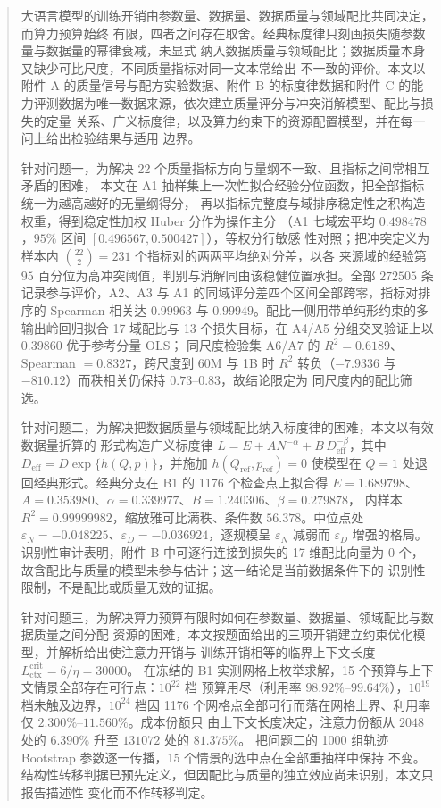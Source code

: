 \documentclass[bwprint]{gmcmthesis}
\numberwithin{equation}{section}
\numberwithin{figure}{section}
\numberwithin{table}{section}
\begin{document}
\begin{abstract}

大语言模型的训练开销由参数量、数据量、数据质量与领域配比共同决定，而算力预算始终
有限，四者之间存在取舍。经典标度律只刻画损失随参数量与数据量的幂律衰减，未显式
纳入数据质量与领域配比；数据质量本身又缺少可比尺度，不同质量指标对同一文本常给出
不一致的评价。本文以附件 A 的质量信号与配方实验数据、附件 B 的标度律数据和附件 C
的能力评测数据为唯一数据来源，依次建立质量评分与冲突消解模型、配比与损失的定量
关系、广义标度律，以及算力约束下的资源配置模型，并在每一问上给出检验结果与适用
边界。

针对问题一，为解决 22 个质量指标方向与量纲不一致、且指标之间常相互矛盾的困难，
本文在 A1 抽样集上一次性拟合经验分位函数，把全部指标统一为越高越好的无量纲得分，
再以指标完整度与域排序稳定性之积构造权重，得到稳定性加权 Huber 分作为操作主分
（A1 七域宏平均 $0.498478$，$95\%$ 区间 $[0.496567,0.500427]$），等权分行敏感
性对照；把冲突定义为样本内 $\binom{22}{2}=231$ 个指标对的两两平均绝对分差，以各
来源域的经验第 $95$ 百分位为高冲突阈值，判别与消解同由该稳健位置承担。全部
$272505$ 条记录参与评价，A2、A3 与 A1 的同域评分差四个区间全部跨零，指标对排序的
Spearman 相关达 $0.99963$ 与 $0.99949$。配比一侧用带单纯形约束的多输出岭回归拟合
17 域配比与 13 个损失目标，在 A4/A5 分组交叉验证上以 $0.39860$ 优于参考分量 OLS；
同尺度检验集 A6/A7 的 $R^2=0.6189$、Spearman $=0.8327$，跨尺度到 60M 与 1B 时
$R^2$ 转负（$-7.9336$ 与 $-810.12$）而秩相关仍保持 $0.73$--$0.83$，故结论限定为
同尺度内的配比筛选。

针对问题二，为解决把数据质量与领域配比纳入标度律的困难，本文以有效数据量折算的
形式构造广义标度律 $L=E+AN^{-\alpha}+B\,D_{\mathrm{eff}}^{-\beta}$，其中
$D_{\mathrm{eff}}=D\exp\{h(Q,p)\}$，并施加 $h(Q_{\mathrm{ref}},p_{\mathrm{ref}})=0$
使模型在 $Q=1$ 处退回经典形式。经典分支在 B1 的 1176 个检查点上拟合得
$E=1.689798$、$A=0.353980$、$\alpha=0.339977$、$B=1.240306$、$\beta=0.279878$，
内样本 $R^2=0.99999982$，缩放雅可比满秩、条件数 $56.378$。中位点处
$\varepsilon_N=-0.048225$、$\varepsilon_D=-0.036924$，逐规模呈 $\varepsilon_N$
减弱而 $\varepsilon_D$ 增强的格局。识别性审计表明，附件 B 中可逐行连接到损失的
17 维配比向量为 $0$ 个，故含配比与质量的模型未参与估计；这一结论是当前数据条件下的
识别性限制，不是配比或质量无效的证据。

针对问题三，为解决算力预算有限时如何在参数量、数据量、领域配比与数据质量之间分配
资源的困难，本文按题面给出的三项开销建立约束优化模型，并解析给出使注意力开销与
训练开销相等的临界上下文长度 $L_{\mathrm{ctx}}^{\mathrm{crit}}=6/\eta=30000$。
在冻结的 B1 实测网格上枚举求解，15 个预算与上下文情景全部存在可行点：$10^{22}$ 档
预算用尽（利用率 $98.92\%$--$99.64\%$），$10^{19}$ 档未触及边界，$10^{24}$ 档因
1176 个网格点全部可行而落在网格上界、利用率仅 $2.300\%$--$11.560\%$。成本份额只
由上下文长度决定，注意力份额从 $2048$ 处的 $6.390\%$ 升至 $131072$ 处的 $81.375\%$。
把问题二的 1000 组轨迹 Bootstrap 参数逐一传播，15 个情景的选中点在全部重抽样中保持
不变。结构性转移判据已预先定义，但因配比与质量的独立效应尚未识别，本文只报告描述性
变化而不作转移判定。


\end{abstract}
\end{document}
